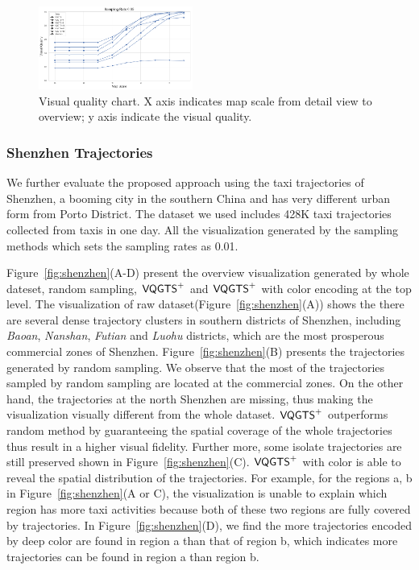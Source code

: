 \begin{figure}[t]
	\centering
	\vspace{2mm}
	\includegraphics[width=0.45\textwidth]{pictures/experiment_study/quanlity.png}
	\caption{Visual quality chart. X axis indicates map scale from detail view to overview; y axis indicate the visual quality. }
	\vspace{0mm}
	\label{fig:quality_chart}
\end{figure}


\subsubsection{Shenzhen Trajectories}
We further evaluate the proposed approach using the taxi trajectories of Shenzhen, a booming city in the southern China and has very different urban form from Porto District. The dataset we used includes 428K taxi trajectories collected from \QM{**} taxis in one day. All the visualization generated by the sampling methods which sets the sampling rates as 0.01.
 
Figure~\ref{fig:shenzhen}(A-D) present the overview visualization generated by whole dateset, random sampling, $\mathsf{VQGTS}^{+}$ and $\mathsf{VQGTS}^{+}$ with color encoding at the top level. The visualization of raw dataset(Figure~\ref{fig:shenzhen}(A)) shows the there are several dense trajectory clusters in southern districts of Shenzhen, including \textit{Baoan}, \textit{Nanshan}, \textit{Futian} and \textit{Luohu} districts, which are the most prosperous commercial zones of Shenzhen. Figure~\ref{fig:shenzhen}(B) presents the trajectories generated by random sampling. We observe that the most of the trajectories sampled by random sampling are located at the commercial zones. On the other hand, the trajectories at the north Shenzhen are missing, thus making the visualization visually different from the whole dataset.
$\mathsf{VQGTS}^{+}$ outperforms random method by guaranteeing the spatial coverage of the whole trajectories thus result in a higher visual fidelity. Further more, some isolate trajectories are still preserved shown in Figure~\ref{fig:shenzhen}(C). $\mathsf{VQGTS}^{+}$ with color is able to reveal the spatial distribution of the trajectories. For example, for the regions a, b in Figure~\ref{fig:shenzhen}(A or C), the visualization is unable to explain which region has more taxi activities because both of these two regions are fully covered by trajectories. In Figure~\ref{fig:shenzhen}(D), we find the more trajectories encoded by deep color are found in region a than that of region b, which indicates more trajectories can be found in region a than region b. 


